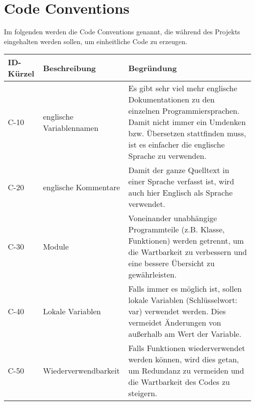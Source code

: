 

\chapter{Code Conventions}
Im folgenden werden die Code Conventions genannt, die während des Projekts eingehalten werden sollen, um einheitliche Code zu erzeugen.


\begin{tabularx}{\textwidth}{|l|X|X|}
    \toprule
    \textbf{ID-Kürzel} & \textbf{Beschreibung} & \textbf{Begründung}\\
    \midrule
    \endhead
    \hline
    \caption{Code Conventions}
    
    \endfoot
    C-10 & englische Variablennamen &  Es gibt sehr viel mehr englische Dokumentationen zu den einzelnen Programmiersprachen. Damit nicht immer ein Umdenken bzw. Übersetzen stattfinden muss, ist es einfacher die englische Sprache zu verwenden.\\
    C-20 & englische Kommentare & Damit der ganze Quelltext in einer Sprache verfasst ist, wird auch hier Englisch als Sprache verwendet.  \\
    C-30 & Module & Voneinander unabhängige Programmteile (z.B. Klasse, Funktionen) werden getrennt, um die Wartbarkeit zu verbessern und eine bessere Übersicht zu gewährleisten.  \\
    C-40 & Lokale Variablen & Falls immer es möglich ist, sollen lokale Variablen (Schlüsselwort: var) verwendet werden. Dies vermeidet Änderungen von außerhalb am Wert der Variable.\\ 
    C-50 & Wiederverwendbarkeit & Falls Funktionen wiederverwendet werden können, wird dies getan, um Redundanz zu vermeiden und die Wartbarkeit des Codes zu steigern.
  
\end{tabularx}



